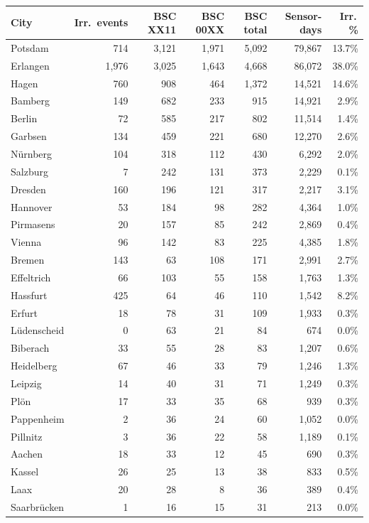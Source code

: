 \begin{tabular}{lrrrrrr}
\toprule
City & Irr.\ events & BSC XX11 & BSC 00XX & BSC total & Sensor-days & Irr.\,\% \\
\midrule
Potsdam & 714 & 3,121 & 1,971 & 5,092 & 79,867 & 13.7\%\\
Erlangen & 1,976 & 3,025 & 1,643 & 4,668 & 86,072 & 38.0\%\\
Hagen & 760 & 908 & 464 & 1,372 & 14,521 & 14.6\%\\
Bamberg & 149 & 682 & 233 & 915 & 14,921 & 2.9\%\\
Berlin & 72 & 585 & 217 & 802 & 11,514 & 1.4\%\\
Garbsen & 134 & 459 & 221 & 680 & 12,270 & 2.6\%\\
N\"urnberg & 104 & 318 & 112 & 430 & 6,292 & 2.0\%\\
Salzburg & 7 & 242 & 131 & 373 & 2,229 & 0.1\%\\
Dresden & 160 & 196 & 121 & 317 & 2,217 & 3.1\%\\
Hannover & 53 & 184 & 98 & 282 & 4,364 & 1.0\%\\
Pirmasens & 20 & 157 & 85 & 242 & 2,869 & 0.4\%\\
Vienna & 96 & 142 & 83 & 225 & 4,385 & 1.8\%\\
Bremen & 143 & 63 & 108 & 171 & 2,991 & 2.7\%\\
Effeltrich & 66 & 103 & 55 & 158 & 1,763 & 1.3\%\\
Hassfurt & 425 & 64 & 46 & 110 & 1,542 & 8.2\%\\
Erfurt & 18 & 78 & 31 & 109 & 1,933 & 0.3\%\\
L\"udenscheid & 0 & 63 & 21 & 84 & 674 & 0.0\%\\
Biberach & 33 & 55 & 28 & 83 & 1,207 & 0.6\%\\
Heidelberg & 67 & 46 & 33 & 79 & 1,246 & 1.3\%\\
Leipzig & 14 & 40 & 31 & 71 & 1,249 & 0.3\%\\
Pl\"on & 17 & 33 & 35 & 68 & 939 & 0.3\%\\
Pappenheim & 2 & 36 & 24 & 60 & 1,052 & 0.0\%\\
Pillnitz & 3 & 36 & 22 & 58 & 1,189 & 0.1\%\\
Aachen & 18 & 33 & 12 & 45 & 690 & 0.3\%\\
Kassel & 26 & 25 & 13 & 38 & 833 & 0.5\%\\
Laax & 20 & 28 & 8 & 36 & 389 & 0.4\%\\
Saarbr\"ucken & 1 & 16 & 15 & 31 & 213 & 0.0\%\\

\end{tabular}
